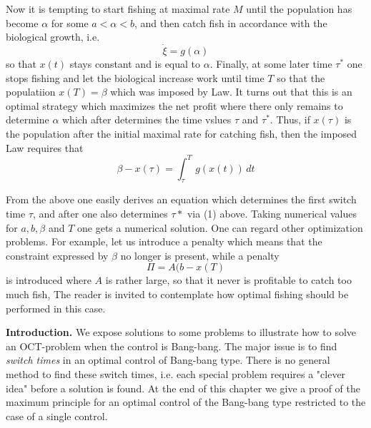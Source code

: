 \documentclass{amsart}
\begin{document}
\noindent
Now it is tempting to
start fishing at maximal  rate $M$ until
the population has become $\alpha$ for some
$a<\alpha<b$, and then
catch fish in accordance with the biological growth, i.e. 
\[
\dot \xi=g(\alpha)
\]
so that $x(t)$ stays constant and is equal to $\alpha$.
Finally, at some later time
$\tau^*$ one stops fishing
and let
the biological increase work until
time
$T$ so that the populatiion  $x(T)=\beta$ which was imposed by
Law.
It  turns out that this is an   optimal strategy which
maximizes the net profit where there only remains
to determine $\alpha$ which after determines 
the time vslues $\tau$ and $\tau^*$.
Thus,  if $x(\tau)$ is the population after
the initial maximal rate for catching  fish, then
the imposed Law requires that
\[
\beta-x(\tau)= \int_\tau ^T\, g(x(t))\, dt\tag{1}
\]
\medskip

\noindent
From the above one easily  derives
an equation which  determines the first 
switch time
$\tau$, and after one also determines $\tau*$
via (1) above.
Taking numerical values for $a,b,\beta$ and $T$
one gets a numerical solution.
One can regard other optimization problems.
For example, let us  introduce a penalty 
which means that
the constraint  expressed  by
$\beta$ no longer is present, while
a penalty
\[
\Pi=A(b-x(T)
\]
is introduced where $A$ is rather large, 
so that it never is profitable to
catch too much fish,
The reader is invited to contemplate how
optimal fishing should be performed in this case.






\newpage
























\noindent
{\bf Introduction.} 
We  expose solutions to some
problems to illustrate how to  solve an OCT-problem when the control is Bang-bang. The major issue
is  to find 
\emph{switch times} in  an optimal control of Bang-bang type.
There is no general  method to find these switch times, i.e. each special problem requires 
a  "clever idea" before a solution is found.
At the end of this chapter
we give a proof of
the maximum principle for an optimal control of the Bang-bang type
restricted to the case of a single control.
\end{document}
